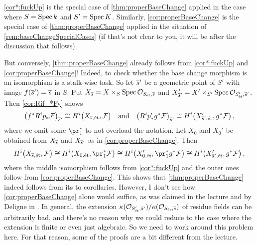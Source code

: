 \documentclass[a4paper, 10pt, oneside, DIV=9, chapterprefix=true, numbers=enddot, bibliography=totoc]{scrbook}
\begin{document}
\begin{rem}\label{rem:fuckUp}
\cref{cor*:fuckUp} is the special case of \cref{thm:properBaseChange} applied in the case where $S=\operatorname{Spec} k$ and $S'=\operatorname{Spec} K$. Similarly,
\cref{cor:properBaseChange} is the special case of \cref{thm:properBaseChange} applied in the situation of \cref{rem:baseChangeSpecialCases} (if that's not clear to you, it will be after the discussion that follows).

But conversely, \cref{thm:properBaseChange} already follows from \cref{cor*:fuckUp} and \cref{cor:properBaseChange}! Indeed, to check whether the base change morphism is an isomorphism is a stalk-wise task. So let $\ov{s}'$ be a geometric point of $S'$ with image $f(\ov{s}')=\ov{s}$ in $S$. Put $X_{\ov{s}}=X\times_S\Spec \Oo_{S_\et,\ov{s}}$ and $X'_{\ov{s}'}=X'\times_{S'}\Spec \Oo_{S'_\et,\ov{s}'}$. Then \cref{cor:Rif_*Fy} shows
\begin{equation*}
	\big(f^*R^i p_*\Ff\big)_{\ov{s}'}\cong H^i\big(X_{\ov
	s,\et},\Ff\big)\quad\text{and}\quad \big(R^i p'_*g^*\Ff\big)_{\ov s'}\cong H^i\big(X'_{\ov{s}',\et},g^*\Ff\big)\,,
\end{equation*}
where we omit some $\pr_1^*$ to not overload the notation. Let $X_0$ and $X_0'$ be obtained from $X_{\ov{s}}$ and $X_{\ov{s}'}$ as in \cref{cor:properBaseChange}. Then
\begin{equation*}
	H^i\big(X_{\ov s,\et},\Ff\big)\cong H^i\big(X_{0,\et},\pr_1^*\Ff\big)\cong H^i\big(X'_{0,\et},\pr_1^*g^*\Ff\big)\cong H^i\big(X'_{\ov s',\et},g^*\Ff\big)\,,
\end{equation*}
where the middle isomorphism follows from \cref{cor*:fuckUp} and the outer ones follow from \cref{cor:properBaseChange}. This shows that \cref{thm:properBaseChange} indeed follows from its to corollaries. However, I don't see how \cref{cor:properBaseChange} alone would suffice, as was claimed in the lecture and by Deligne in \cite[Arcata~IV]{sga4.5}. In general, the extension $\kappa(\Oo_{S'_\et,\ov{s}'})/\kappa(\Oo_{S_\et,\ov{s}})$ of residue fields can be arbitrarily bad, and there's no reason why we could reduce to the case where the extension is finite or even just algebraic. So we need to work around this problem here. For that reason, some of the proofs are a bit different from the lecture.


\end{rem}
\end{document}
